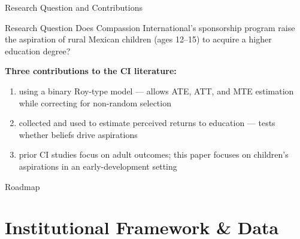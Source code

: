 \documentclass[aspectratio=169, 10pt]{beamer}
\begin{document}
\begin{frame}{Research Question and Contributions}
  \begin{block}{Research Question}
    Does Compassion International's sponsorship program raise the aspiration of rural Mexican children (ages 12--15) to acquire a higher education degree?
  \end{block}
  \vspace{0.8em}
  \textbf{Three contributions to the CI literature:}
  \begin{enumerate}
    \item {} using a binary Roy-type model \citep{Aakvik2005} — allows ATE, ATT, and MTE estimation while correcting for non-random selection
    \item {} collected and used to estimate perceived returns to education — tests whether beliefs drive aspirations
    \item {} prior CI studies focus on adult outcomes; this paper focuses on children's aspirations in an early-development setting
  \end{enumerate}
\end{frame}

\begin{frame}{Roadmap}
  \tableofcontents
\end{frame}

\section{Institutional Framework \& Data}
\end{document}
